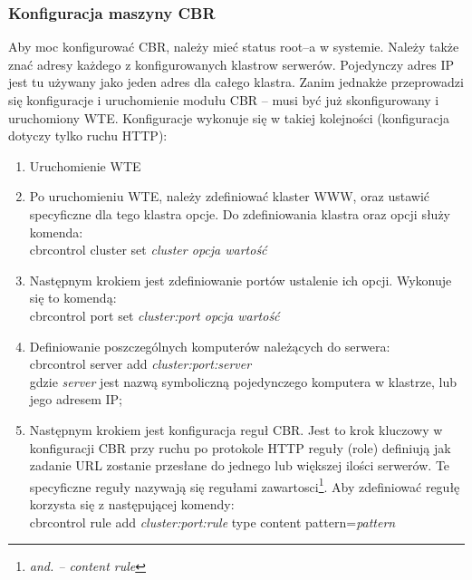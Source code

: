 \subsubsection{Konfiguracja maszyny CBR}

Aby moc konfigurować CBR, należy mieć status root--a w systemie. Należy także znać adresy każdego z
konfigurowanych klastrow serwerów. Pojedynczy adres IP jest tu używany jako jeden adres dla całego klastra.
Zanim jednakże przeprowadzi się konfiguracje i uruchomienie modułu CBR -- musi być już skonfigurowany i
uruchomiony WTE. Konfiguracje wykonuje się w takiej kolejności (konfiguracja dotyczy tylko ruchu HTTP):
    \begin{enumerate}
    \item Uruchomienie WTE
    \item Po uruchomieniu WTE, należy zdefiniować klaster WWW, oraz ustawić specyficzne dla tego
    klastra opcje. Do zdefiniowania klastra oraz opcji służy komenda:\\
    
    cbrcontrol cluster set \emph{cluster opcja wartość}\\
    
    \item Następnym krokiem jest zdefiniowanie portów ustalenie ich opcji. Wykonuje się to komendą:\\
    
    cbrcontrol port set \emph{cluster:port opcja wartość}\\
    
    \item Definiowanie poszczególnych komputerów należących do serwera:\\
    
    cbrcontrol server add \emph{cluster:port:server}\\
    
    gdzie \emph{server} jest nazwą symboliczną pojedynczego komputera w klastrze, lub jego adresem IP;
    \item Następnym krokiem jest konfiguracja reguł CBR. Jest to krok kluczowy w konfiguracji CBR przy ruchu po protokole HTTP
    reguły (role) definiują jak zadanie URL zostanie przesłane do jednego lub większej ilości serwerów. Te specyficzne
    reguły nazywają się regułami zawartosci\footnote{\emph{and. -- content rule}}. Aby zdefiniować regułę
    korzysta się z następującej komendy:\\
    
    cbrcontrol rule add \emph{cluster:port:rule} type content pattern=\emph{pattern}\\
    

\end{enumerate}
